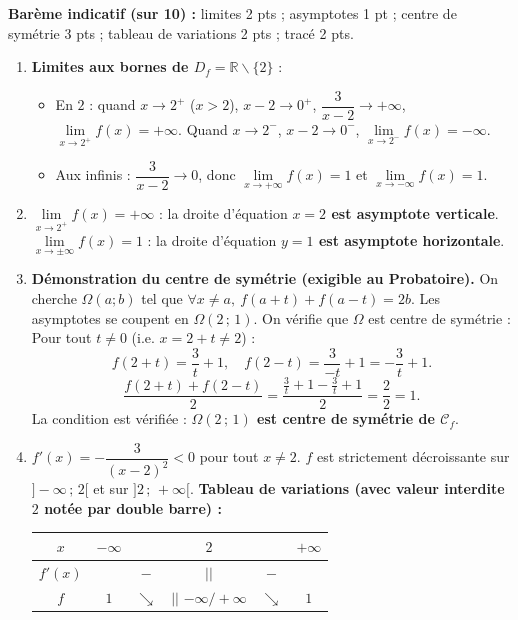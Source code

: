 \documentclass[11pt]{article}
\def\setminus{\mathbin{\backslash}}\let\smallsetminus\setminus
\begin{document}
\begin{corrige}
\textbf{Barème indicatif (sur 10) :} limites 2 pts ; asymptotes 1 pt ; centre de symétrie 3 pts ; tableau de variations 2 pts ; tracé 2 pts.
\begin{enumerate}
    \item \textbf{Limites aux bornes de $D_f=\mathbb{R}\setminus\{2\}$} :
    \begin{itemize}
        \item En $2$ : quand $x\to 2^+$ ($x>2$), $x-2\to 0^+$, $\dfrac{3}{x-2}\to +\infty$, $\lim\limits_{x\to 2^+}f(x)=+\infty$.
        Quand $x\to 2^-$, $x-2\to 0^-$, $\lim\limits_{x\to 2^-}f(x)=-\infty$.
        \item Aux infinis : $\dfrac{3}{x-2}\to 0$, donc $\lim\limits_{x\to +\infty}f(x)=1$ et $\lim\limits_{x\to -\infty}f(x)=1$.
    \end{itemize}
    \item $\lim\limits_{x\to 2^+}f(x)=+\infty$ : la droite d'équation \textbf{$x=2$ est asymptote verticale}.
    $\lim\limits_{x\to\pm\infty}f(x)=1$ : la droite d'équation \textbf{$y=1$ est asymptote horizontale}.
    \item \textbf{Démonstration du centre de symétrie (exigible au Probatoire).}
    On cherche $\Omega(a;b)$ tel que $\forall x\neq a,\ f(a+t)+f(a-t)=2b$.
    Les asymptotes se coupent en $\Omega(2\,;\,1)$. On vérifie que $\Omega$ est centre de symétrie :
    Pour tout $t\neq 0$ (i.e. $x=2+t\neq 2$) :
    \[ f(2+t)=\frac{3}{t}+1,\quad f(2-t)=\frac{3}{-t}+1=-\frac{3}{t}+1. \]
    \[ \frac{f(2+t)+f(2-t)}{2}=\frac{\frac{3}{t}+1-\frac{3}{t}+1}{2}=\frac{2}{2}=1. \]
    La condition est vérifiée : \textbf{$\Omega(2\,;\,1)$ est centre de symétrie de $\mathcal{C}_f$}.
    \item $f'(x)=-\dfrac{3}{(x-2)^2}<0$ pour tout $x\neq 2$.
    $f$ est strictement décroissante sur $]-\infty\,;\,2[$ et sur $]2\,;\,+\infty[$.
    \textbf{Tableau de variations (avec valeur interdite $2$ notée par double barre) :}
    \begin{center}
    \begin{tabular}{|c|cc||ccc|}\hline
    $x$ & $-\infty$ & & $2$ & & $+\infty$ \\ \hline
    $f'(x)$ & & $-$ & $||$ & $-$ & \\ \hline
    $f$ & $1$ & $\searrow$ & $||$ $-\infty/+\infty$ & $\searrow$ & $1$ \\ \hline
    \end{tabular}

\end{center}
\end{enumerate}
\end{corrige}
\end{document}
